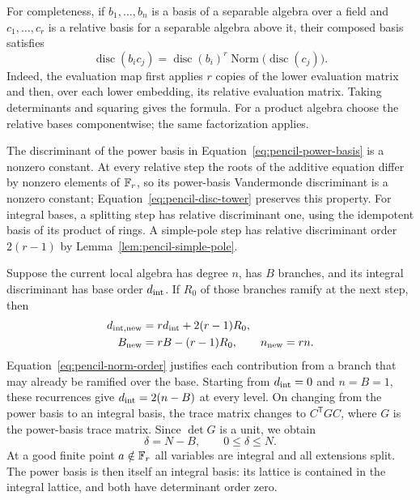 For completeness, if $b_1,\ldots,b_n$ is a basis of a separable algebra
over a field and $c_1,\ldots,c_r$ is a relative basis for a separable
algebra above it, their composed basis satisfies
\begin{equation}\label{eq:pencil-disc-tower}
 \operatorname{disc}(b_i c_j)
 =\operatorname{disc}(b_i)^r
   \operatorname{Norm}\bigl(\operatorname{disc}(c_j)\bigr).
\end{equation}
Indeed, the evaluation map first applies $r$ copies of the lower
evaluation matrix and then, over each lower embedding, its relative
evaluation matrix.  Taking determinants and squaring gives the formula.
For a product algebra choose the relative bases componentwise; the same
factorization applies.

The discriminant of the power basis in
Equation~\ref{eq:pencil-power-basis} is a nonzero constant.  At every
relative step the roots of the additive equation differ by nonzero
elements of $\mathbb F_r$, so its power-basis Vandermonde discriminant is a
nonzero constant; Equation~\ref{eq:pencil-disc-tower} preserves this
property.  For integral bases, a splitting step has relative
discriminant one, using the idempotent basis of its product of rings.
A simple-pole step has relative discriminant order $2(r-1)$ by
Lemma~\ref{lem:pencil-simple-pole}.

Suppose the current local algebra has degree $n$, has $B$ branches,
and its integral discriminant has base order $d_{\rm int}$.  If $R_0$
of those branches ramify at the next step, then
\begin{align*}
 d_{\rm int,new}&=r d_{\rm int}+2(r-1)R_0,\\
 B_{\rm new}&=rB-(r-1)R_0,\qquad n_{\rm new}=rn.
\end{align*}
Equation~\ref{eq:pencil-norm-order} justifies each contribution from a
branch that may already be ramified over the base.  Starting from
$d_{\rm int}=0$ and $n=B=1$, these recurrences give
$d_{\rm int}=2(n-B)$ at every level.  On changing from the power basis
to an integral basis, the trace matrix changes to $C^{\mathsf T}GC$,
where $G$ is the power-basis trace matrix.  Since $\det G$ is a unit,
we obtain
\begin{equation}\label{eq:pencil-lattice-det}
 \delta=N-B,\qquad 0\leq\delta\leq N.
\end{equation}
At a good finite point $a\notin\mathbb F_r$ all variables are integral and
all extensions split.  The power basis is then itself an integral
basis: its lattice is contained in the integral lattice, and both have
determinant order zero.

